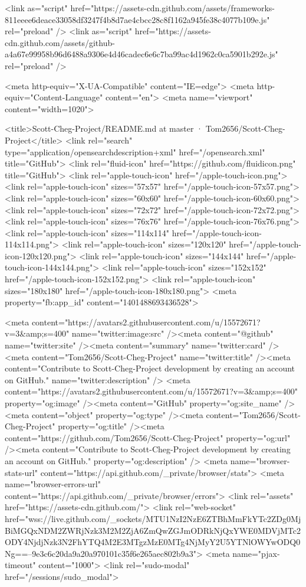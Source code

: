 \begin{DoxyVerb}<link as="script" href="https://assets-cdn.github.com/assets/frameworks-811eeee6deace33058df3247f4b8d7ae4cbcc28c8f1162a945fe38c4077b109e.js" rel="preload" />
<link as="script" href="https://assets-cdn.github.com/assets/github-a4a67e99958b96d6488a9306e4d46cadec6e6c7ba99ac4d1962c0ca5901b292e.js" rel="preload" />

<meta http-equiv="X-UA-Compatible" content="IE=edge">
<meta http-equiv="Content-Language" content="en">
<meta name="viewport" content="width=1020">


<title>Scott-Cheg-Project/README.md at master · Tom2656/Scott-Cheg-Project</title>
<link rel="search" type="application/opensearchdescription+xml" href="/opensearch.xml" title="GitHub">
<link rel="fluid-icon" href="https://github.com/fluidicon.png" title="GitHub">
<link rel="apple-touch-icon" href="/apple-touch-icon.png">
<link rel="apple-touch-icon" sizes="57x57" href="/apple-touch-icon-57x57.png">
<link rel="apple-touch-icon" sizes="60x60" href="/apple-touch-icon-60x60.png">
<link rel="apple-touch-icon" sizes="72x72" href="/apple-touch-icon-72x72.png">
<link rel="apple-touch-icon" sizes="76x76" href="/apple-touch-icon-76x76.png">
<link rel="apple-touch-icon" sizes="114x114" href="/apple-touch-icon-114x114.png">
<link rel="apple-touch-icon" sizes="120x120" href="/apple-touch-icon-120x120.png">
<link rel="apple-touch-icon" sizes="144x144" href="/apple-touch-icon-144x144.png">
<link rel="apple-touch-icon" sizes="152x152" href="/apple-touch-icon-152x152.png">
<link rel="apple-touch-icon" sizes="180x180" href="/apple-touch-icon-180x180.png">
<meta property="fb:app_id" content="1401488693436528">

  <meta content="https://avatars2.githubusercontent.com/u/15572671?v=3&amp;s=400" name="twitter:image:src" /><meta content="@github" name="twitter:site" /><meta content="summary" name="twitter:card" /><meta content="Tom2656/Scott-Cheg-Project" name="twitter:title" /><meta content="Contribute to Scott-Cheg-Project development by creating an account on GitHub." name="twitter:description" />
  <meta content="https://avatars2.githubusercontent.com/u/15572671?v=3&amp;s=400" property="og:image" /><meta content="GitHub" property="og:site_name" /><meta content="object" property="og:type" /><meta content="Tom2656/Scott-Cheg-Project" property="og:title" /><meta content="https://github.com/Tom2656/Scott-Cheg-Project" property="og:url" /><meta content="Contribute to Scott-Cheg-Project development by creating an account on GitHub." property="og:description" />
  <meta name="browser-stats-url" content="https://api.github.com/_private/browser/stats">
<meta name="browser-errors-url" content="https://api.github.com/_private/browser/errors">
<link rel="assets" href="https://assets-cdn.github.com/">
<link rel="web-socket" href="wss://live.github.com/_sockets/MTU1NzI2NzE6ZTBhMmFkYTc2ZDg0MjBiMGQxNDM2ZWRjNzk3M2M2ZjA6ZmQwZGJmODRkNjQxYWE0MDVjMTc2ODY4NjdjNzk3N2FhYTQ4M2E3MTgzMzE0MTg4NjMyY2U5YTNlOWYwODQ0Ng==--9e3c6c20da9a20a970101c35f6e265aec802b9a3">
<meta name="pjax-timeout" content="1000">
<link rel="sudo-modal" href="/sessions/sudo_modal">


\end{DoxyVerb}
